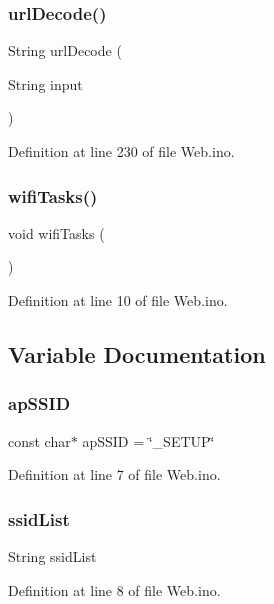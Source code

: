 \subsubsection{\texorpdfstring{urlDecode()}{urlDecode()}}
{\footnotesize\ttfamily String url\+Decode (\begin{DoxyParamCaption}\item[{String}]{input }\end{DoxyParamCaption})}



Definition at line 230 of file Web.\+ino.

\mbox{\label{_web_8ino_a6f6f044bce35a405bc05f223e20f8cf7}} 
\subsubsection{\texorpdfstring{wifiTasks()}{wifiTasks()}}
{\footnotesize\ttfamily void wifi\+Tasks (\begin{DoxyParamCaption}{ }\end{DoxyParamCaption})}



Definition at line 10 of file Web.\+ino.



\subsection{Variable Documentation}
\mbox{\label{_web_8ino_a4dc496fb2eea29ebc9e871cee941fa09}} 
\subsubsection{\texorpdfstring{apSSID}{apSSID}}
{\footnotesize\ttfamily const char$\ast$ ap\+S\+S\+ID = \char`\"{}\+\_\+\+S\+E\+T\+UP\char`\"{}}



Definition at line 7 of file Web.\+ino.

\mbox{\label{_web_8ino_ae5d189232399d7728ea364065b9727c4}} 
\subsubsection{\texorpdfstring{ssidList}{ssidList}}
{\footnotesize\ttfamily String ssid\+List}



Definition at line 8 of file Web.\+ino.


